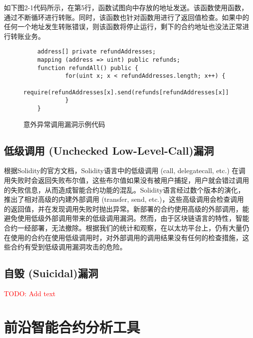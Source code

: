 如下图2-1代码所示，在第5行，函数试图向中存放的地址发送。该函数使用函数，通过不断循环进行转账。同时，该函数也针对函数用进行了返回值检查。如果中的任何一个地址发生转账错误，则该函数将停止运行，剩下的合约地址也没法正常进行转账业务。
\small
\begin{figure}
\begin{minipage}[htbp]{1.0\linewidth}
    \begin{lstlisting}
    address[] private refundAddresses;
    mapping (address => uint) public refunds;
    function refundAll() public {
            for(uint x; x < refundAddresses.length; x++) {
                require(refundAddresses[x].send(refunds[refundAddresses[x]]));
            }
    }
    \end{lstlisting}
\end{minipage}
\vspace{-5mm}
\caption{意外异常调用漏洞示例代码}
\end{figure}
\normalsize

\subsection{低级调用 (Unchecked Low-Level-Call)漏洞}

根据Solidity的官方文档\cite{solidity-doc}，Solidity语言中的低级调用 (call, delegatecall, etc.) 在调用失败时会返回失败布尔值，这些布尔值如果没有被用户捕捉，用户就会错过调用的失败信息，从而造成智能合约功能的混乱。Solidity语言经过数个版本的演化，推出了相对高级的内建外部调用 (transfer, send, etc.)，这些高级调用会检查调用的返回值，并在发现调用失败时抛出异常。新部署的合约使用高级的外部调用，能避免使用低级外部调用带来的低级调用漏洞。然而，由于区块链语言的特性，智能合约一经部署，无法撤除。根据我们的统计和观察，在以太坊平台上，仍有大量仍在使用的合约在使用低级调用时，对外部调用的调用结果没有任何的检查措施，这些合约有受到低级调用漏洞攻击的危险。

\subsection{自毁 (Suicidal)漏洞}

\textcolor{red}{TODO: Add text}

\section{前沿智能合约分析工具}

